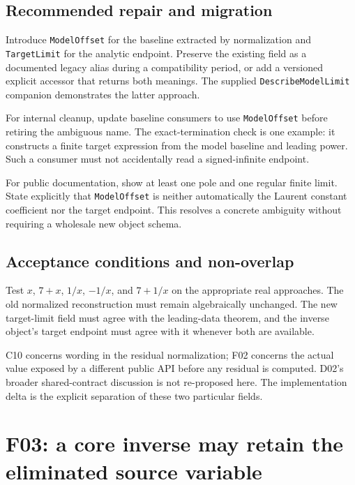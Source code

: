 \documentclass[11pt,letterpaper]{article}
\newcommand{\code}[1]{\nolinkurl{#1}}
\begin{document}
\subsection{Recommended repair and migration}
Introduce \code{ModelOffset} for the baseline extracted by normalization and \code{TargetLimit} for the analytic endpoint. Preserve the existing field as a documented legacy alias during a compatibility period, or add a versioned explicit accessor that returns both meanings. The supplied \code{DescribeModelLimit} companion demonstrates the latter approach.

For internal cleanup, update baseline consumers to use \code{ModelOffset} before retiring the ambiguous name. The exact-termination check is one example: it constructs a finite target expression from the model baseline and leading power. Such a consumer must not accidentally read a signed-infinite endpoint.\cite{termination}

For public documentation, show at least one pole and one regular finite limit. State explicitly that \code{ModelOffset} is neither automatically the Laurent constant coefficient nor the target endpoint. This resolves a concrete ambiguity without requiring a wholesale new object schema.

\subsection{Acceptance conditions and non-overlap}
Test \(x\), \(7+x\), \(1/x\), \(-1/x\), and \(7+1/x\) on the appropriate real approaches. The old normalized reconstruction must remain algebraically unchanged. The new target-limit field must agree with the leading-data theorem, and the inverse object's target endpoint must agree with it whenever both are available.

C10 concerns wording in the residual normalization; F02 concerns the actual value exposed by a different public API before any residual is computed. D02's broader shared-contract discussion is not re-proposed here. The implementation delta is the explicit separation of these two particular fields.\cite{register}

\section{F03: a core inverse may retain the eliminated source variable}
\label{sec:perturbative}
\end{document}
